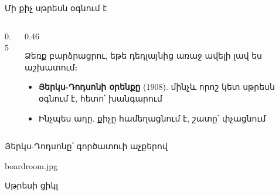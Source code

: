 \begin{frame}{Մի քիչ սթրեսն օգնում է}
  \begin{columns}[c]
    \begin{column}{0.5\textwidth}
      \centering
      
    \end{column}
    \begin{column}{0.46\textwidth}
      \begin{poll}
        Ձեռք բարձրացրու, եթե դեդլայնից առաջ ավելի լավ ես աշխատում։
      \end{poll}
      \begin{itemize}
        \item<2-> \textbf{Յերկս-Դոդսոնի օրենքը} (1908). մինչև որոշ կետ սթրեսն օգնում է, հետո՝ խանգարում
        \item<3-> Ինչպես աղը. քիչը համեղացնում է, շատը՝ փչացնում 
      \end{itemize}
    \end{column}
  \end{columns}
\end{frame}

\begin{frame}{Յերկս-Դոդսոնը՝ գործատուի աչքերով}
  \centering
  \begin{meme}[4.6cm]{boardroom.jpg}
  \end{meme}
\end{frame}

\begin{frame}{Սթրեսի ցիկլ}
  \centering
  \par\medskip
\end{frame}

